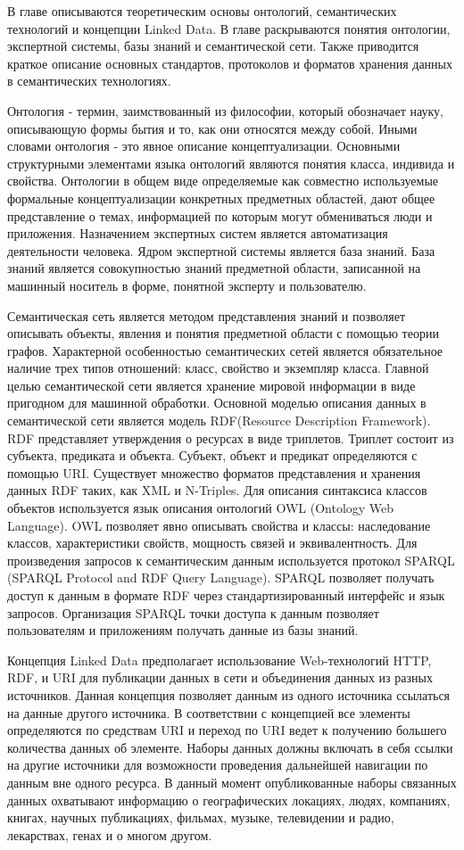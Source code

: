 В главе описываются теоретическим основы онтологий, семантических технологий и концепции Linked Data. В главе раскрываются понятия онтологии, экспертной системы, базы знаний и семантической сети. Также приводится краткое описание основных стандартов, протоколов и форматов хранения данных в семантических технологиях.

Онтология - термин, заимствованный из философии, который обозначает науку, описывающую формы бытия и то, как они относятся между собой. Иными словами онтология - это явное описание концептуализации. Основными структурными элементами языка онтологий являются понятия класса, индивида и свойства. Онтологии в общем виде определяемые как совместно используемые формальные концептуализации конкретных предметных областей, дают общее представление о темах, информацией по которым могут обмениваться люди и приложения. Назначением экспертных систем является автоматизация деятельности человека. Ядром экспертной системы является база знаний. База знаний является совокупностью  знаний предметной области, записанной на машинный носитель в форме, понятной эксперту и пользователю.

Семантическая сеть является  методом представления знаний и позволяет описывать объекты, явления и понятия предметной области с помощью теории графов. Характерной особенностью семантических сетей является обязательное наличие трех типов отношений: класс, свойство и экземпляр класса. Главной целью семантической сети является хранение мировой информации в виде пригодном для машинной обработки. Основной моделью описания данных в семантической сети является модель RDF(Resource Description Framework).  RDF представляет утверждения о ресурсах в виде триплетов. Триплет состоит из субъекта, предиката и объекта. Субъект, объект и предикат определяются с помощью URI. Существует множество форматов представления и хранения данных RDF таких, как XML и N-Triples. Для описания синтаксиса классов объектов используется язык описания онтологий OWL (Ontology Web Language). OWL позволяет явно описывать свойства и классы: наследование классов, характеристики свойств, мощность связей и эквивалентность. Для произведения запросов к семантическим данным используется протокол SPARQL (SPARQL Protocol and RDF Query Language). SPARQL позволяет получать доступ к данным в формате RDF через стандартизированный интерфейс и язык запросов. Организация SPARQL точки доступа к данным позволяет пользователям и приложениям получать данные из базы знаний.

Концепция Linked Data предполагает использование Web-технологий HTTP, RDF, и URI для публикации данных в сети и объединения данных из разных источников. Данная концепция позволяет данным из одного источника ссылаться на данные другого источника. В соответствии с концепцией все элементы определяются по средствам URI и переход по URI ведет к получению большего количества данных об элементе. Наборы данных должны включать в себя ссылки на другие источники для возможности проведения дальнейшей навигации по данным вне одного ресурса. В данный момент опубликованные наборы связанных данных охватывают информацию о географических локациях, людях, компаниях, книгах, научных публикациях, фильмах, музыке, телевидении и радио, лекарствах, генах и о многом другом.

